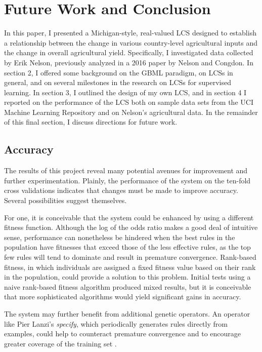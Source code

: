 \documentclass[11pt]{article}
\begin{document}
\section{Future Work and Conclusion}

In this paper, I presented a Michigan-style, real-valued LCS designed to establish a relationship between the change in various country-level agricultural inputs and the change in overall agricultural yield. Specifically, I investigated data collected by Erik Nelson, previously analyzed in a 2016 paper by Nelson and Congdon. In section 2, I offered some background on the GBML paradigm, on LCSs in general, and on several milestones in the research on LCSs for supervised learning. In section 3, I outlined the design of my own LCS, and in section 4 I reported on the performance of the LCS both on sample data sets from the UCI Machine Learning Repository and on Nelson's agricultural data. In the remainder of this final section, I discuss directions for future work.

\subsection{Accuracy}
The results of this project reveal many potential avenues for improvement and further experimentation. Plainly, the performance of the system on the ten-fold cross validations indicates that changes must be made to improve accuracy. Several possibilities suggest themselves. 

For one, it is conceivable that the system could be enhanced by using a different fitness function. Although the log of the odds ratio makes a good deal of intuitive sense, performance can nonetheless be hindered when the best rules in the population have fitnesses that exceed those of the less effective rules, as the top few rules will tend to dominate and result in premature convergence. Rank-based fitness, in which individuals are assigned a fixed fitness value based on their rank in the population, could provide a solution to this problem. Initial tests using a naive rank-based fitness algorithm produced mixed results, but it is conceivable that more sophisticated algorithms would yield significant gains in accuracy.

The system may further benefit from additional genetic operators. An operator like Pier Lanzi's \emph{specify}, which periodically generates rules directly from examples, could help to counteract premature convergence and to encourage greater coverage of the training set \cite{lanzi_study_1997}.
\end{document}
